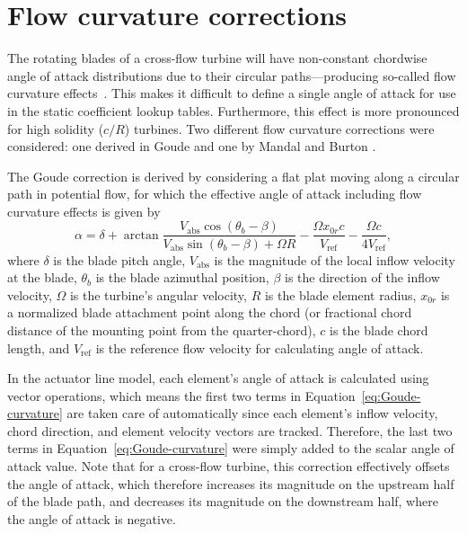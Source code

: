 \documentclass[times]{weauth}
\begin{document}
\section{Flow curvature corrections}

The rotating blades of a cross-flow turbine will have non-constant chordwise
angle of attack distributions due to their circular paths---producing so-called
flow curvature effects~\cite{Migliore1980}. This makes it difficult to define a
single angle of attack for use in the static coefficient lookup tables.
Furthermore, this effect is more pronounced for high solidity ($c/R$) turbines.
Two different flow curvature corrections were considered: one derived in Goude
\cite{Goude2012} and one by Mandal and Burton \cite{Mandal1994}.

The Goude correction is derived by considering a flat plat moving along a
circular path in potential flow, for which the effective angle of attack
including flow curvature effects is given by
\begin{equation}
    \alpha = \delta + \arctan \frac{V_\mathrm{abs} \cos(\theta_b -
        \beta)}{V_\mathrm{abs} \sin(\theta_b - \beta) + \Omega R} - \frac{\Omega
        x_{0r}c}{V_\mathrm{ref}} - \frac{\Omega c}{4 V_\mathrm{ref}},
    \label{eq:Goude-curvature}
\end{equation}
where $\delta$ is the blade pitch angle, $V_\mathrm{abs}$ is the magnitude of
the local inflow velocity at the blade, $\theta_b$ is the blade azimuthal
position, $\beta$ is the direction of the inflow velocity, $\Omega$ is the
turbine's angular velocity, $R$ is the blade element radius, $x_{0r}$ is a
normalized blade attachment point along the chord (or fractional chord distance
of the mounting point from the quarter-chord), $c$ is the blade chord length,
and $V_\mathrm{ref}$ is the reference flow velocity for calculating angle of
attack.

In the actuator line model, each element's angle of attack is calculated using
vector operations, which means the first two terms in
Equation~\ref{eq:Goude-curvature} are taken care of automatically since each
element's inflow velocity, chord direction, and element velocity vectors are
tracked. Therefore, the last two terms in Equation~\ref{eq:Goude-curvature} were
simply added to the scalar angle of attack value. Note that for a cross-flow
turbine, this correction effectively offsets the angle of attack, which
therefore increases its magnitude on the upstream half of the blade path, and
decreases its magnitude on the downstream half, where the angle of attack is
negative.
\end{document}
